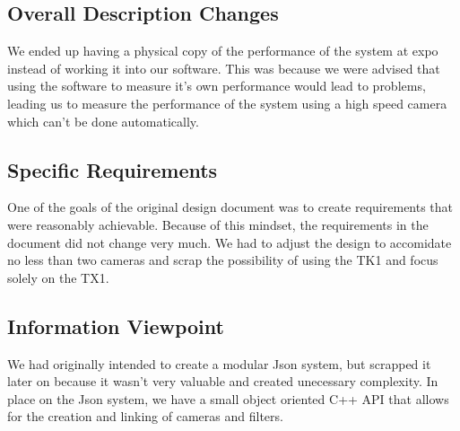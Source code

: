 \subsection{Overall Description Changes}
We ended up having a physical copy of the performance of the system at expo instead of working it into our software. This was because we were advised that using the software to measure it's own performance would lead to problems, leading us to measure the performance of the system using a high speed camera which can't be done automatically.
\subsection{Specific Requirements}
One of the goals of the original design document was to create requirements that were reasonably achievable. Because of this mindset, the requirements in the document did not change very much. We had to adjust the design to accomidate no less than two cameras and scrap the possibility of using the TK1 and focus solely on the TX1.
\subsection{Information Viewpoint}
We had originally intended to create a modular Json system, but scrapped it later on because it wasn't very valuable and created unecessary complexity. In place on the Json system, we have a small object oriented C++ API that allows for the creation and linking of cameras and filters.

